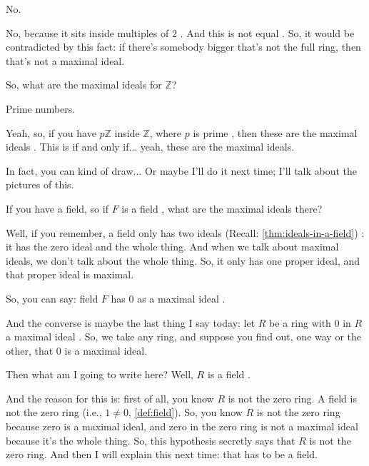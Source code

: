\begin{student}
No.
\end{student}

\begin{speech}[00:40:57 - 00:41:18]
No, because it sits inside multiples of $2$ . And this is not equal . So, it would be contradicted by this fact: if there's somebody bigger that's not the full ring, then that's not a maximal ideal.

So, what are the maximal ideals for $\mathbb{Z}$?
\end{speech}

\begin{student}
Prime numbers.
\end{student}

\begin{speech}[00:41:21 - 00:43:42]
Yeah, so, if you have $p\mathbb{Z}$ inside $\mathbb{Z}$, where $p$ is prime , then these are the maximal ideals . This is if and only if... yeah, these are the maximal ideals.

In fact, you can kind of draw... Or maybe I'll do it next time; I'll talk about the pictures of this.

If you have a field, so if $F$ is a field , what are the maximal ideals there?

Well, if you remember, a field only has two ideals (Recall: \cref{thm:ideals-in-a-field}) : it has the zero ideal and the whole thing. And when we talk about maximal ideals, we don't talk about the whole thing. So, it only has one proper ideal, and that proper ideal is maximal.

So, you can say: field $F$ has $0$ as a maximal ideal .

And the converse is maybe the last thing I say today: let $R$ be a ring  with $0$ in $R$ a maximal ideal . So, we take any ring, and suppose you find out, one way or the other, that $0$ is a maximal ideal.

Then what am I going to write here? Well, $R$ is a field .

And the reason for this is: first of all, you know $R$ is not the zero ring. A field is not the zero ring (i.e., $1 \neq 0$, \cref{def:field}). So, you know $R$ is not the zero ring because zero is a maximal ideal, and zero in the zero ring is not a maximal ideal because it's the whole thing. So, this hypothesis secretly says that $R$ is not the zero ring. And then I will explain this next time: that has to be a field. 
\end{speech}

